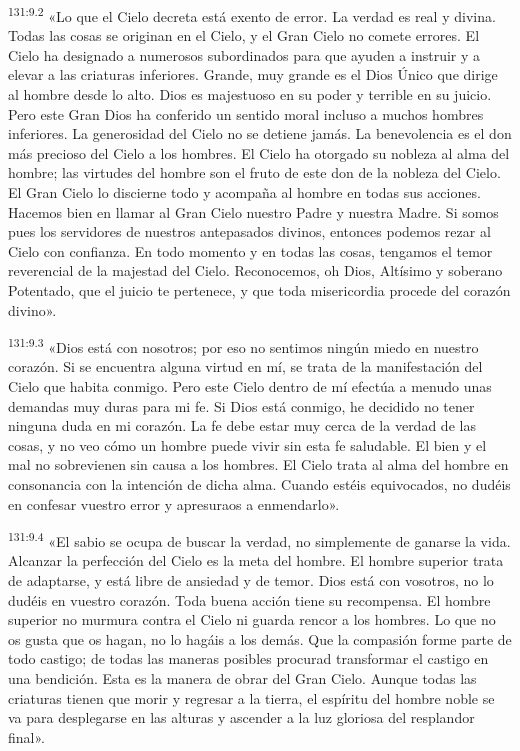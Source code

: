 \par 
\textsuperscript{131:9.2} «Lo que el Cielo decreta está exento de error. La verdad es real y divina. Todas las cosas se originan en el Cielo, y el Gran Cielo no comete errores. El Cielo ha designado a numerosos subordinados para que ayuden a instruir y a elevar a las criaturas inferiores. Grande, muy grande es el Dios Único que dirige al hombre desde lo alto. Dios es majestuoso en su poder y terrible en su juicio. Pero este Gran Dios ha conferido un sentido moral incluso a muchos hombres inferiores. La generosidad del Cielo no se detiene jamás. La benevolencia es el don más precioso del Cielo a los hombres. El Cielo ha otorgado su nobleza al alma del hombre; las virtudes del hombre son el fruto de este don de la nobleza del Cielo. El Gran Cielo lo discierne todo y acompaña al hombre en todas sus acciones. Hacemos bien en llamar al Gran Cielo nuestro Padre y nuestra Madre. Si somos pues los servidores de nuestros antepasados divinos, entonces podemos rezar al Cielo con confianza. En todo momento y en todas las cosas, tengamos el temor reverencial de la majestad del Cielo. Reconocemos, oh Dios, Altísimo y soberano Potentado, que el juicio te pertenece, y que toda misericordia procede del corazón divino».

\par 
\textsuperscript{131:9.3} «Dios está con nosotros; por eso no sentimos ningún miedo en nuestro corazón. Si se encuentra alguna virtud en mí, se trata de la manifestación del Cielo que habita conmigo. Pero este Cielo dentro de mí efectúa a menudo unas demandas muy duras para mi fe. Si Dios está conmigo, he decidido no tener ninguna duda en mi corazón. La fe debe estar muy cerca de la verdad de las cosas, y no veo cómo un hombre puede vivir sin esta fe saludable. El bien y el mal no sobrevienen sin causa a los hombres. El Cielo trata al alma del hombre en consonancia con la intención de dicha alma. Cuando estéis equivocados, no dudéis en confesar vuestro error y apresuraos a enmendarlo».

\par 
\textsuperscript{131:9.4} «El sabio se ocupa de buscar la verdad, no simplemente de ganarse la vida. Alcanzar la perfección del Cielo es la meta del hombre. El hombre superior trata de adaptarse, y está libre de ansiedad y de temor. Dios está con vosotros, no lo dudéis en vuestro corazón. Toda buena acción tiene su recompensa. El hombre superior no murmura contra el Cielo ni guarda rencor a los hombres. Lo que no os gusta que os hagan, no lo hagáis a los demás. Que la compasión forme parte de todo castigo; de todas las maneras posibles procurad transformar el castigo en una bendición. Esta es la manera de obrar del Gran Cielo. Aunque todas las criaturas tienen que morir y regresar a la tierra, el espíritu del hombre noble se va para desplegarse en las alturas y ascender a la luz gloriosa del resplandor final».

